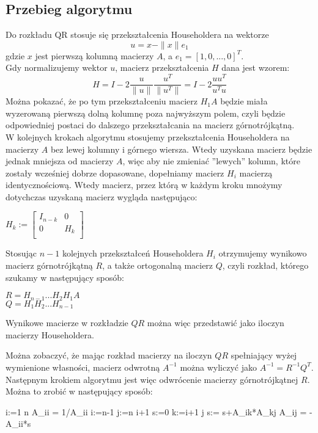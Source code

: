 \documentclass[11pt]{article}
\begin{document}
\subsection{Przebieg algorytmu}
Do rozkładu QR stosuje się przekształcenia Householdera na wektorze 
\begin{equation*}
u=x-\|x\|e_1
\end{equation*}
gdzie $x$ jest pierwszą kolumną macierzy $A$, a $e_1 = [1, 0, ..., 0]^T$.\\

Gdy normalizujemy wektor $u$, macierz przekształcenia $H$ dana jest wzorem:
\begin{equation*}
H=I-2\frac{u}{\|u\|}\frac{u^T}{\|u^T\|} = I-2\frac{uu^T}{u^Tu}
\end{equation*}
Można pokazać, że po tym przekształceniu macierz $H_1A$ będzie miała wyzerowaną
pierwszą dolną kolumnę poza najwyższym polem, czyli będzie odpowiedniej postaci
do dalszego przekształcania na macierz górnotrójkątną. \\

W kolejnych krokach algorytmu 
stosujemy przekształcenia Householdera na macierzy $A$ bez lewej kolumny i górnego wiersza.
Wtedy uzyskana macierz będzie jednak mniejsza od macierzy $A$, więc aby nie zmieniać ''lewych'' kolumn,
które zostały wcześniej dobrze dopasowane, dopełniamy macierz $H_i$ macierzą identycznościową.
Wtedy macierz, przez którą w każdym kroku mnożymy dotychczas uzyskaną macierz wygląda następująco:
\begin{center}
\begin{math}
H_k :=
\begin{bmatrix}
    I_{n-k} & 0 \\
    0 & H_k \\
\end{bmatrix}
\end{math}
\end{center}

Stosując $n-1$ kolejnych przekształceń Householdera $H_i$ otrzymujemy wynikowo macierz górnotrójkątną $R$, 
a także ortogonalną macierz $Q$, czyli rozkład, którego szukamy w następujący sposób:
\begin{center}
$R = H_{n-1}...H_2H_1A $ \\
$Q = H_1H_2...H_{n-1}$
\end{center}

Wynikowe macierze w rozkładzie $QR$ można więc przedstawić jako iloczyn macierzy Householdera.

Można zobaczyć, że mając rozkład macierzy na iloczyn $QR$ spełniający wyżej wymienione własności,
macierz odwrotną $A^{-1}$ można wyliczyć jako $A^{-1}=R^{-1}Q^T$. Następnym krokiem algorytmu jest więc
odwrócenie macierzy górnotrójkątnej $R$. Można to zrobić w następujący sposób:\\
\begin{program}
  \FOR i:=1 \TO n \DO
	A_{ii} = 1/A_{ii}
  \FOR i:=n-1   \DO
	\FOR j:=n  \TO i+1 \DO
	  s:=0
	  \FOR k:=i+1 \TO j \DO
	    s:= s+A_{ik}*A_{kj}
	  A_{ij} = - A_{ii}*s
\end{program}
\end{document}
